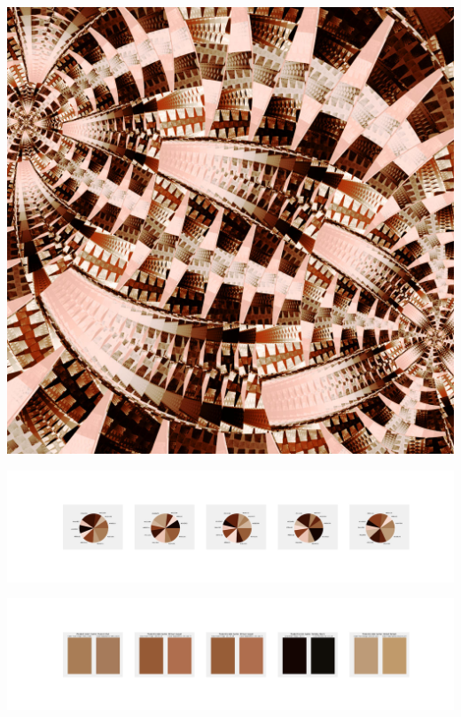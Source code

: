 \documentclass[11pt]{article}
\begin{document}
\begin{landscape}
    \begin{center}
    \includegraphics[width=\textwidth]{./nbimg/file (449).jpg}
    \end{center}

    \begin{center}
    \includegraphics[width=250mm]{./nbimg/pie-388.jpg}
    \end{center}

    \begin{center}
    \includegraphics[width=250mm]{./nbimg/peak-388.jpg}
    \end{center}
    


\end{landscape}
\end{document}
